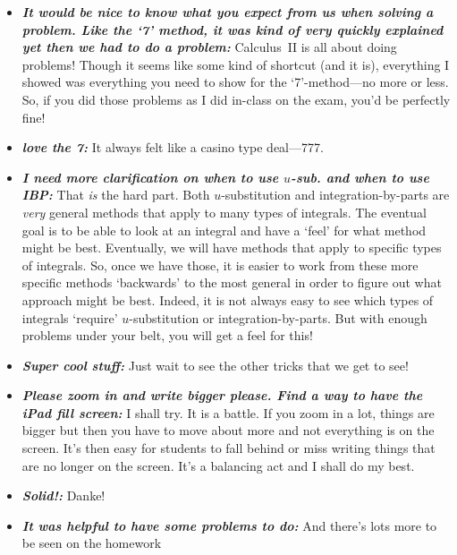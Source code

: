 \documentclass[11pt,letterpaper]{article}
\begin{document}
\begin{itemize}
\item {\bfseries\itshape It would be nice to know what you expect from us when solving a problem. Like the `7' method, it was kind of very quickly explained yet then we had to do a problem:} Calculus~II is all about doing problems! Though it seems like some kind of shortcut (and it is), everything I showed was everything you need to show for the `7'-method---no more or less. So, if you did those problems as I did in-class on the exam, you'd be perfectly fine!

\item {\bfseries\itshape love the 7:} It always felt like a casino type deal---777. 

\item {\bfseries\itshape I need more clarification on when to use $u$-sub. and when to use IBP:} That \textit{is} the hard part. Both $u$-substitution and integration-by-parts are \textit{very} general methods that apply to many types of integrals. The eventual goal is to be able to look at an integral and have a `feel' for what method might be best. Eventually, we will have methods that apply to specific types of integrals. So, once we have those, it is easier to work from these more specific methods `backwards' to the most general in order to figure out what approach might be best. Indeed, it is not always easy to see which types of integrals `require' $u$-substitution or integration-by-parts. But with enough problems under your belt, you will get a feel for this!

\item {\bfseries\itshape Super cool stuff:} Just wait to see the other tricks that we get to see!

\item {\bfseries\itshape Please zoom in and write bigger please. Find a way to have the iPad fill screen:} I shall try. It is a battle. If you zoom in a lot, things are bigger but then you have to move about more and not everything is on the screen. It's then easy for students to fall behind or miss writing things that are no longer on the screen. It's a balancing act and I shall do my best. 

\item {\bfseries\itshape Solid!:} Danke!

\item {\bfseries\itshape It was helpful to have some problems to do:} And there's lots more to be seen on the homework \Laughey
\end{itemize}
\end{document}
